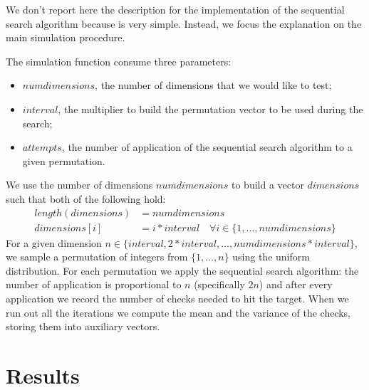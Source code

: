 \documentclass[twoside,openright,titlepage,fleqn,
	headinclude,11pt,a4paper,BCOR5mm,footinclude
	]{scrbook}
\begin{document}
We don't report here the description for the implementation of the
sequential search algorithm because is very simple. Instead, we focus
the explanation on the main simulation procedure.

The simulation function consume three parameters:
\begin{itemize}
\item $numdimensions$, the number of dimensions that we would like to
  test;
\item $interval$, the multiplier to build the permutation vector to be
  used during the search;
\item $attempts$, the number of application of the sequential search
  algorithm to a given permutation.
\end{itemize}
We use the number of dimensions $numdimensions$ to build a vector
$dimensions$ such that both of the following hold:
\begin{displaymath}
  \begin{split}
    length(dimensions)&=numdimensions \\
    dimensions[i]&=i * interval \quad \forall i \in \{1,\ldots,numdimensions\}
  \end{split}
\end{displaymath}
For a given dimension $n \in \{interval, 2*interval,
\ldots,numdimensions*interval\}$, we sample a permutation of integers
from $\{1,\ldots,n\}$ using the uniform distribution. For each
permutation we apply the sequential search algorithm: the number of
application is proportional to $n$ (specifically $2n$) and after every
application we record the number of checks needed to hit the target.
When we run out all the iterations we compute the mean and the
variance of the checks, storing them into auxiliary vectors.

\section{Results}
\end{document}
